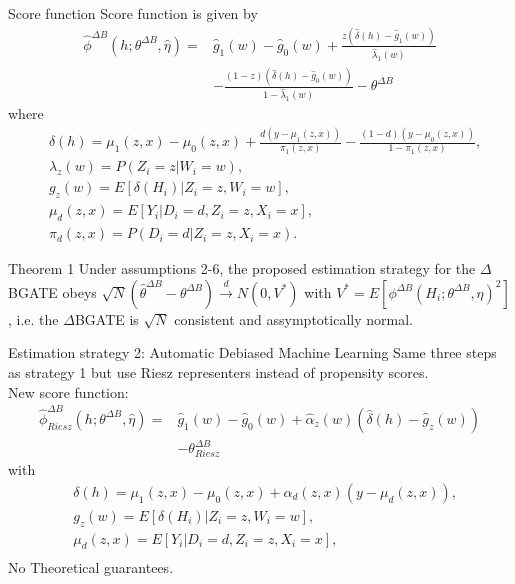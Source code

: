 \documentclass{beamer}\usepackage{listings}
\begin{document}
\begin{frame}[label={sec:org7d8bbfc}]{Score function}
Score function is given by
\begin{align*}
\hat{\phi}^{\Delta B}(h;\theta^{\Delta B},\hat{\eta}) = &\hat{g}_1(w)-\hat{g}_0(w)+\frac{z\left(\hat{\delta}(h)-\hat{g}_1(w)\right)}{\hat{\lambda}_1(w)}\\
&-\frac{(1-z)\left(\hat{\delta}(h)-\hat{g}_0(w)\right)}{1-\hat{\lambda}_1(w)}-\theta^{\Delta B}
\end{align*}
where
\begin{align*}
&\delta(h) = \mu_1(z,x)-\mu_0(z,x)+\frac{d(y-\mu_1(z,x))}{\pi_1(z,x)}-\frac{(1-d)(y-\mu_0(z,x))}{1-\pi_1(z,x)},
\\
&\lambda_z(w) = P(Z_i = z\vert W_i = w),\\
&g_z(w) = E[\delta(H_i)\vert Z_i = z,W_i = w],\\
&\mu_d(z,x) = E[Y_i\vert D_i = d,Z_i = z,X_i = x],\\
&\pi_d(z,x) = P(D_i = d\vert Z_i = z,X_i = x).
\end{align*}
\end{frame}


\begin{frame}[label={sec:org20e9d8c}]{Theorem 1}
Under assumptions 2-6, the proposed estimation strategy for the \(\Delta\)BGATE obeys \(\sqrt{N}(\hat{\theta}^{\Delta B}-\theta^{\Delta B})\xrightarrow{d}N(0,V^*)\) with \(V^* = E[\phi^{\Delta B}(H_i;\theta^{\Delta B},\eta)^2]\), i.e. the \(\Delta\)BGATE is \(\sqrt{N}\) consistent and assymptotically normal.
\end{frame}


\begin{frame}[label={sec:orgeb2a2df}]{Estimation strategy 2: Automatic Debiased Machine Learning}
Same three steps as strategy 1 but use Riesz representers instead of propensity scores.\pause \\[0pt]
New score function:
\begin{align*}
\hat{\phi}^{\Delta B}_{Riesz}(h;\theta^{\Delta B},\hat{\eta}) = &\hat{g}_1(w)-\hat{g}_0(w)+\hat{\alpha}_z(w)\left(\hat{\delta}(h)-\hat{g}_z(w)\right)\\
&-\theta^{\Delta B}_{Riesz}
\end{align*}
with
\begin{align*}
&\delta(h) = \mu_1(z,x)-\mu_0(z,x)+\alpha_d(z,x)(y-\mu_d(z,x)),
\\
&g_z(w) = E[\delta(H_i)\vert Z_i = z,W_i = w],\\
&\mu_d(z,x) = E[Y_i\vert D_i = d,Z_i = z,X_i = x],\\
\end{align*}
\pause
No Theoretical guarantees.
\end{frame}
\end{document}
